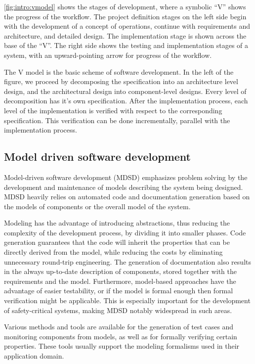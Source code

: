 \cref{fig:intro:vmodel} shows the stages of development, where a symbolic ``V'' shows the progress of the workflow. The project definition stages on the left side begin with the development of a concept of operations, continue with requirements and architecture, and detailed design. The implementation stage is shown across the base of the ``V''. The right side shows the testing and implementation stages of a system, with an upward-pointing arrow for progress of the workflow\citep{vmodel}. 

The V model is the basic scheme of software development. In the left of the figure, we proceed by decomposing the specification into an architecture level design, and the architectural design into component-level designs. Every level of decomposition has it's own specification. After the implementation process, each level of the implementation is verified with respect to the corresponding specification. This verification can be done incrementally, parallel  with the implementation process.

\subsection{Model driven software development}

Model-driven software development (MDSD) emphasizes problem solving by the development and maintenance of models describing the system being designed. MDSD heavily relies on automated code and documentation generation based on the models of components or the overall model of the system. 

Modeling has the advantage of introducing abstractions, thus reducing the complexity of the development process, by dividing it into smaller phases. Code generation guarantees that the code will inherit the properties that can be directly derived from the model, while reducing the costs by eliminating unnecessary round-trip engineering. The generation of documentation also results in the always up-to-date description of components, stored together with the requirements and the model. Furthermore, model-based approaches have the advantage of easier testability, or if the model is formal enough then formal verification might be applicable. This is especially important for the development of safety-critical systems, making MDSD notably widespread in such areas.

Various methods and tools are available for the generation of test cases and monitoring components from models, as well as for formally verifying certain properties. These tools usually support the modeling formalisms used in their application domain.

